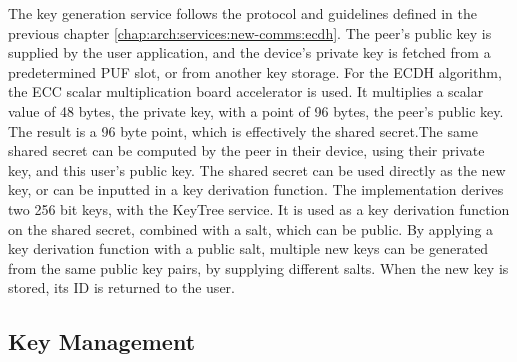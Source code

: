 The key generation service follows the protocol and guidelines defined in the previous chapter \ref{chap:arch:services:new-comms:ecdh}.
The peer's public key is supplied by the user application, and the device's private key is fetched from a predetermined PUF slot, or from another key storage.
For the ECDH algorithm, the ECC scalar multiplication board accelerator is used. It multiplies a scalar value of 48 bytes, the private key, with a point of 96 bytes, the peer's public key. The result is a 96 byte point, which is effectively the shared secret.The same shared secret can be computed by the peer in their device, using their private key, and this user's public key.
The shared secret can be used directly as the new key, or can be inputted in a key derivation function.
The implementation derives two 256 bit keys, with the KeyTree service. It is used as a key derivation function on the shared secret, combined with a salt, which can be public.
By applying a key derivation function with a public salt, multiple new keys can be generated from the same public key pairs, by supplying different salts. 
When the new key is stored, its ID is returned to the user.

\subsection{Key Management}\label{chap:implementation:services:key-import}

